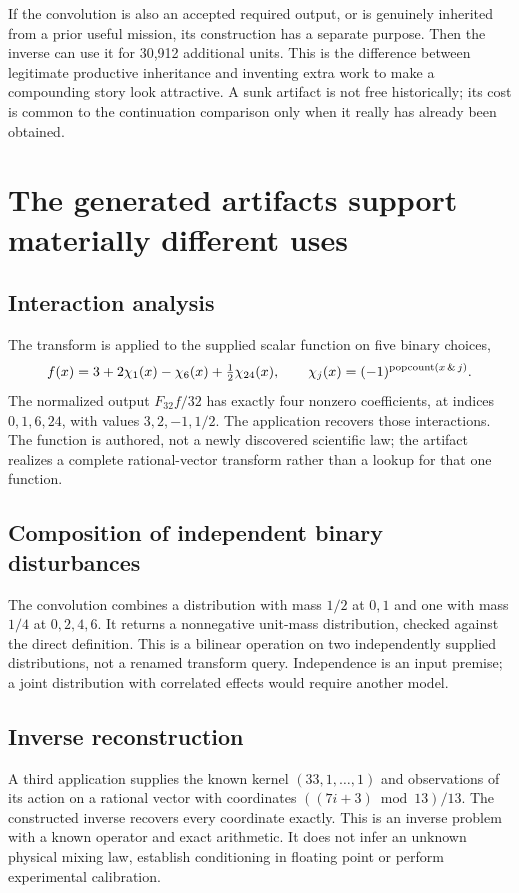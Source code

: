 \documentclass[11pt,letterpaper]{article}
\theoremstyle{definition}\newtheorem{definition}[theorem]{Definition}
\theoremstyle{remark}\newtheorem{remark}[theorem]{Remark}
\begin{document}
If the convolution is also an accepted required output, or is genuinely inherited from a prior useful mission, its construction has a separate purpose. Then the inverse can use it for 30,912 additional units. This is the difference between legitimate productive inheritance and inventing extra work to make a compounding story look attractive. A sunk artifact is not free historically; its cost is common to the continuation comparison only when it really has already been obtained.

\section{The generated artifacts support materially different uses}
\subsection{Interaction analysis}
The transform is applied to the supplied scalar function on five binary choices,
\begin{equation}
 f(x)=3+2\chi_1(x)-\chi_6(x)+\tfrac12\chi_{24}(x),\qquad
 \chi_j(x)=(-1)^{\operatorname{popcount}(x\,\&\,j)}.
\end{equation}
The normalized output $F_{32}f/32$ has exactly four nonzero coefficients, at indices $0,1,6,24$, with values $3,2,-1,1/2$. The application recovers those interactions. The function is authored, not a newly discovered scientific law; the artifact realizes a complete rational-vector transform rather than a lookup for that one function.

\subsection{Composition of independent binary disturbances}
The convolution combines a distribution with mass $1/2$ at $0,1$ and one with mass $1/4$ at $0,2,4,6$. It returns a nonnegative unit-mass distribution, checked against the direct definition. This is a bilinear operation on two independently supplied distributions, not a renamed transform query. Independence is an input premise; a joint distribution with correlated effects would require another model.

\subsection{Inverse reconstruction}
A third application supplies the known kernel $(33,1,\ldots,1)$ and observations of its action on a rational vector with coordinates $((7i+3)\bmod13)/13$. The constructed inverse recovers every coordinate exactly. This is an inverse problem with a known operator and exact arithmetic. It does not infer an unknown physical mixing law, establish conditioning in floating point or perform experimental calibration.
\end{document}
